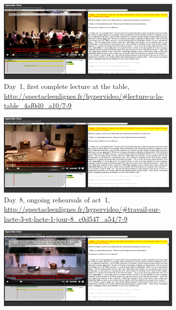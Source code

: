 \documentclass[runningheads,a4paper]{llncs}
\begin{document}
\begin{figure}
        \centering
        \begin{subfigure}[t]{0.32\textwidth}
                \centering
                \includegraphics[width=\textwidth]{spel1}
                \caption{Day~1, first complete lecture at the table,
                	\url{http://spectacleenlignes.fr/hypervideo/\#lecture-a-la-table_4af0d0_a10/7-9}}
                \label{fig:day1}
        \end{subfigure}
        \hfill
        \begin{subfigure}[t]{0.32\textwidth}
                \centering
                \includegraphics[width=\textwidth]{spel2}
                \caption{Day~8, ongoing rehearsals of act~1,
                	\url{http://spectacleenlignes.fr/hypervideo/\#travail-sur-lacte-3-et-lacte-1-jour-8_c0d547_a54/7-9}}
                \label{fig:day8}
        \end{subfigure}
        \hfill
        \begin{subfigure}[t]{0.32\textwidth}
                \centering
                \includegraphics[width=\textwidth]{spel3}

\end{subfigure}
\end{figure}
\end{document}

